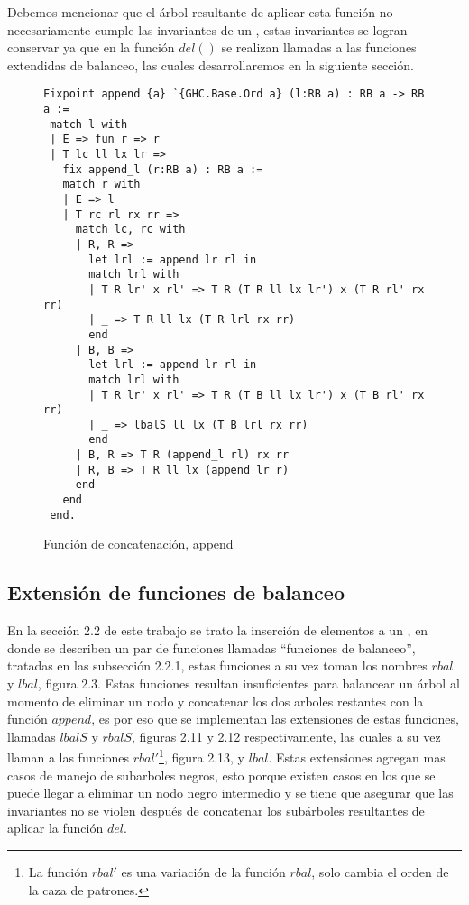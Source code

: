 Debemos mencionar que el \'arbol resultante de aplicar esta funci\'on no necesariamente cumple las
invariantes de un {\arn}, estas invariantes se logran conservar ya que en la funci\'on $del()$ se
realizan llamadas a las funciones extendidas de balanceo, las cuales desarrollaremos en la
siguiente sección.

\begin{figure}
\centering
\captionsetup{justification=centering}
\begin{verbatim}
Fixpoint append {a} `{GHC.Base.Ord a} (l:RB a) : RB a -> RB a :=
 match l with
 | E => fun r => r
 | T lc ll lx lr =>
   fix append_l (r:RB a) : RB a :=
   match r with
   | E => l
   | T rc rl rx rr =>
     match lc, rc with
     | R, R =>
       let lrl := append lr rl in
       match lrl with
       | T R lr' x rl' => T R (T R ll lx lr') x (T R rl' rx rr)
       | _ => T R ll lx (T R lrl rx rr)
       end
     | B, B =>
       let lrl := append lr rl in
       match lrl with
       | T R lr' x rl' => T R (T B ll lx lr') x (T B rl' rx rr)
       | _ => lbalS ll lx (T B lrl rx rr)
       end
     | B, R => T R (append_l rl) rx rr
     | R, B => T R ll lx (append lr r)
     end
   end
 end.
\end{verbatim}
\caption{Funci\'on de concatenaci\'on, append}
\end{figure}

\subsection{Extensi\'on de funciones de balanceo}

En la secci\'on 2.2 de este trabajo se trato la inserci\'on de elementos a un \arn, en donde se
describen un par de funciones llamadas ``funciones de balanceo'', tratadas en las subsecci\'on
2.2.1, estas funciones a su vez toman los nombres $rbal$ y $lbal$, figura 2.3. Estas funciones
resultan insuficientes para balancear un \'arbol al momento de eliminar un nodo y concatenar los
dos arboles restantes con la función $append$, es por eso que se implementan las extensiones de
estas funciones, llamadas $lbalS$ y $rbalS$, figuras 2.11 y 2.12 respectivamente, las cuales a su
vez llaman a las funciones $rbal'$\footnote{La funci\'on $rbal'$ es una variación de la función
$rbal$, solo cambia el orden de la caza de patrones.}, figura 2.13, y $lbal$. Estas extensiones
agregan mas casos de manejo de subarboles negros, esto porque existen casos en los que se puede
llegar a eliminar un nodo negro intermedio y se tiene que asegurar que las invariantes no se
violen después de concatenar los subárboles resultantes de aplicar la función $del$.

